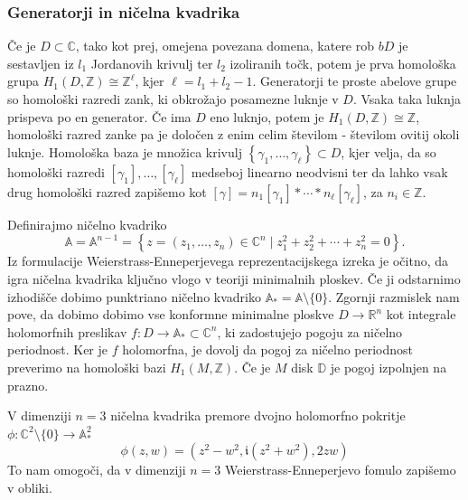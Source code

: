 \documentclass[8pt]{beamer}
\theoremstyle{definition}
\theoremstyle{remark}
\theoremstyle{plain}
\numberwithin{equation}{section}  %
\begin{document}
\begin{frame}
    \frametitle{Generatorji in ničelna kvadrika}

    Če je $D \subset \mathbb{C}$, tako kot prej, omejena povezana domena, katere rob $b D$ je sestavljen iz $l_1$ Jordanovih krivulj ter $l_2$ izoliranih točk, potem je prva homološka grupa $H_1(D, \mathbb{Z}) \cong\mathbb{Z}^\ell$, kjer $\ell = l_1 + l_2 - 1$. \textcolor{red1}{Generatorji} te proste abelove grupe so homološki razredi zank, ki obkrožajo posamezne luknje v $D$. Vsaka taka luknja prispeva po en generator. Če ima $D$ eno luknjo, potem je $H_1(D, \mathbb{Z}) \cong \mathbb{Z}$, homološki razred zanke pa je določen z enim celim številom - številom ovitij okoli luknje. \textcolor{red1}{Homološka baza} je množica krivulj $\left\{\gamma_1, \ldots, \gamma_{\ell}\right\} \subset D$, kjer velja, da so homološki razredi $\left[\gamma_1\right], \ldots,\left[\gamma_{\ell}\right]$ medseboj linearno neodvisni ter da lahko vsak drug homološki razred zapišemo kot $[\gamma]=n_1\left[\gamma_1\right]*\cdots*n_{\ell}\left[\gamma_{\ell}\right]$,  za $n_i \in \mathbb{Z}$.
    
    \vspace{0.8em}

    Definirajmo \textcolor{red1}{ničelno kvadriko} 
    \begin{equation*}
        \mathbb{A}=\mathbb{A}^{n-1}=\left\{z=\left(z_1, \ldots, z_n\right) \in \mathbb{C}^n \mid z_1^2+z_2^2+\cdots+z_n^2=0\right\}.    
    \end{equation*}
    Iz formulacije Weierstrass-Enneperjevega reprezentacijskega izreka je očitno, da igra ničelna kvadrika ključno vlogo v teoriji minimalnih ploskev. Če ji odstarnimo izhodišče dobimo \textcolor{red1}{punktriano ničelno kvadriko} $\mathbb{A}_*=\mathbb{A} \setminus \{0\}$. Zgornji razmislek nam pove, da dobimo dobimo vse konformne minimalne ploskve $D \rightarrow \mathbb{R}^n$ kot integrale holomorfnih preslikav $f: D \rightarrow \mathbb{A}_* \subset \mathbb{C}^n$, ki zadostujejo pogoju za ničelno periodnost. Ker je $f$ holomorfna, je dovolj da pogoj za ničelno periodnost preverimo na homološki bazi $H_1(M, \mathbb{Z})$. Če je $M$ disk $\mathbb{D}$ je pogoj izpolnjen na prazno. 
    \vspace{0.8em}
    
    V dimenziji $n=3$ ničelna kvadrika premore dvojno holomorfno pokritje $\phi: \mathbb{C}^2 \setminus \{0\} \rightarrow \mathbb{A}_*^2$
    \begin{equation*}
        \phi(z, w)=\left(z^2-w^2, \mathfrak{i}\left(z^2+w^2\right), 2 z w\right)
    \end{equation*}
    To nam omogoči, da v dimenziji $n=3$ Weierstrass-Enneperjevo fomulo zapišemo v obliki. 

\end{frame}
\end{document}
